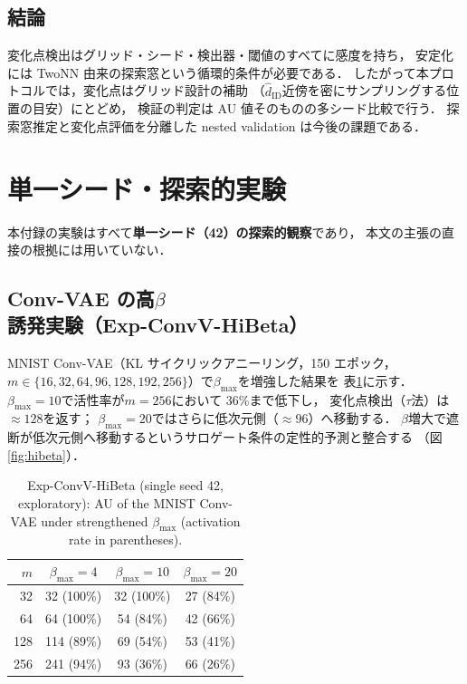 \documentclass[11pt,a4paper]{jsarticle}
\newcommand{\hatdID}{\hat{d}_{\mathrm{ID}}}
\begin{document}
\subsection{結論}

変化点検出はグリッド・シード・検出器・閾値のすべてに感度を持ち，
安定化には TwoNN 由来の探索窓という循環的条件が必要である．
したがって本プロトコルでは，変化点はグリッド設計の補助
（$\hatdID$近傍を密にサンプリングする位置の目安）にとどめ，
検証の判定は AU 値そのものの多シード比較で行う．
探索窓推定と変化点評価を分離した nested validation は今後の課題である．

\section{単一シード・探索的実験}\label{app:exploratory}

本付録の実験はすべて\textbf{単一シード（42）の探索的観察}であり，
本文の主張の直接の根拠には用いていない．

\subsection{Conv-VAE の高$\beta$誘発実験（Exp-ConvV-HiBeta）}

MNIST Conv-VAE（KL サイクリックアニーリング，150 エポック，
$m \in \{16, 32, 64, 96, 128, 192, 256\}$）で$\beta_{\max}$を増強した結果を
表\ref{tab:hibeta}に示す．
$\beta_{\max} = 10$で活性率が$m = 256$において 36\%まで低下し，
変化点検出（$\tau$法）は$\approx 128$を返す；
$\beta_{\max} = 20$ではさらに低次元側（$\approx 96$）へ移動する．
$\beta$増大で遮断が低次元側へ移動するというサロゲート条件の定性的予測と整合する
（図\ref{fig:hibeta}）．

\begin{table}[H]
\centering
\caption{Exp-ConvV-HiBeta (single seed 42, exploratory): AU of the MNIST
Conv-VAE under strengthened $\beta_{\max}$ (activation rate in parentheses).}
\label{tab:hibeta}
\small
\begin{tabular}{rccc}
\toprule
$m$ & $\beta_{\max} = 4$ & $\beta_{\max} = 10$ & $\beta_{\max} = 20$ \\
\midrule
 32 & 32 (100\%) & 32 (100\%) & 27 (84\%) \\
 64 & 64 (100\%) & 54 (84\%) & 42 (66\%) \\
128 & 114 (89\%) & 69 (54\%) & 53 (41\%) \\
256 & 241 (94\%) & 93 (36\%) & 66 (26\%) \\
\bottomrule
\end{tabular}
\end{table}
\end{document}
